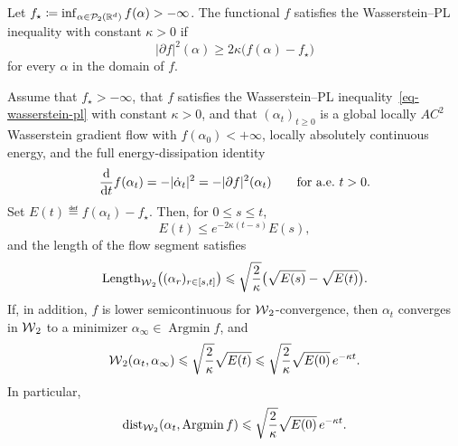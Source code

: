 \begin{defn}\label{def-wasserstein-pl}
	Let \(f_\star\coloneqq\inf_{\alpha\in\mathcal{P}_2(\mathbb{R}^d)} f(\alpha)>-\infty\). The functional \(f\) satisfies the Wasserstein--PL inequality with constant \(\kappa>0\) if
	\begin{equation}\label{eq-wasserstein-pl}
		|\partial f|^2(\alpha)
		\geq
		2\kappa\bigl(f(\alpha)-f_\star\bigr)
	\end{equation}
	for every \(\alpha\) in the domain of \(f\).
\end{defn}

\begin{thm}\label{thm-wasserstein-pl-convergence}
	Assume that \(f_\star>-\infty\), that \(f\) satisfies the Wasserstein--PL inequality~\eqref{eq-wasserstein-pl} with constant \(\kappa>0\), and that \((\alpha_t)_{t\geq0}\) is a global locally $AC^2$ Wasserstein gradient flow with $f(\alpha_0)<+\infty$, locally absolutely continuous energy, and the full energy-dissipation identity
	\begin{equation}\label{eq-full-wasserstein-energy-dissipation}
		\frac{\mathrm{d}}{\mathrm{d} t}f(\alpha_t)
		=
		-|\dot\alpha_t|^2
		=
		-|\partial f|^2(\alpha_t)
		\qquad\text{for a.e.\ }t>0.
	\end{equation}
	Set \(E(t)\eqdef f(\alpha_t)-f_\star\). Then, for \(0\leq s\leq t\),
	\[
		E(t)\leq e^{-2\kappa(t-s)}E(s),
	\]
	and the length of the flow segment satisfies
	\[
		\operatorname{Length}_{\operatorname{\mathcal{W}}_2}\bigl((\alpha_r)_{r\in[s,t]}\bigr)
		\leqslant
		\sqrt{\frac{2}{\kappa}}\bigl(\sqrt{E(s)}-\sqrt{E(t)}\bigr).
	\]
	If, in addition, \(f\) is lower semicontinuous for \(\operatorname{\mathcal{W}}_2\)-convergence, then \(\alpha_t\) converges in \(\operatorname{\mathcal{W}}_2\) to a minimizer \(\alpha_\infty\in\operatorname{Argmin} f\), and
	\[
		\operatorname{\mathcal{W}}_2(\alpha_t,\alpha_\infty)
		\leqslant
		\sqrt{\frac{2}{\kappa}}\sqrt{E(t)}
		\leqslant
		\sqrt{\frac{2}{\kappa}}\sqrt{E(0)}\,e^{-\kappa t}.
	\]
	In particular,
	\[
		\operatorname{dist}_{\operatorname{\mathcal{W}}_2}(\alpha_t,\operatorname{Argmin}f)
		\leqslant
		\sqrt{\frac{2}{\kappa}}\sqrt{E(0)}\,e^{-\kappa t}.
	\]
\end{thm}

